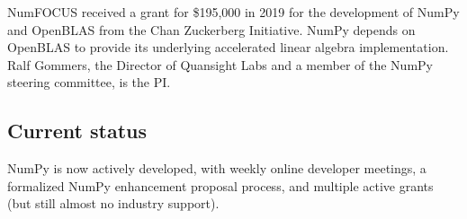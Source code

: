 \documentclass[fleqn,10pt]{wlscirep}
\begin{document}



NumFOCUS received a grant for \$195,000 in 2019 for the development of NumPy
and OpenBLAS from the Chan Zuckerberg Initiative. 
NumPy depends on OpenBLAS to provide its underlying accelerated linear algebra implementation.
Ralf Gommers, the Director of Quansight Labs and a member of
the NumPy steering committee, is the PI.




\subsection*{Current status}

NumPy is now actively developed, with weekly online developer
meetings, a formalized NumPy enhancement proposal process, and
multiple active grants (but still almost no industry support).



\end{document}
